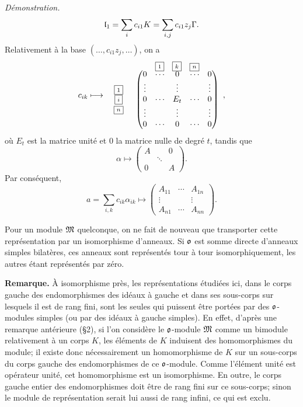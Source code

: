 \emph{Démonstration.}
\[
        \mathfrak{l}_1=\sum_i c_{i1}K=\sum_{i,j}c_{i1}z_j\Gamma.
\]
Relativement à la base $(\ldots,c_{i1}z_j,\ldots)$, on a
\[
c_{ik}\longmapsto
\begin{array}{c@{\quad}c}
 & \begin{array}{ccc} \boxed{\scriptstyle 1} & \boxed{\scriptstyle k} & \boxed{\scriptstyle n} \end{array}\\[-.2em]
\begin{array}{c}\boxed{\scriptstyle 1}\\ \boxed{\scriptstyle i}\\ \boxed{\scriptstyle n}\end{array}
&
\begin{pmatrix}
0&\cdots&0&\cdots&0\\
\vdots&&\vdots&&\vdots\\
0&\cdots&E_t&\cdots&0\\
\vdots&&\vdots&&\vdots\\
0&\cdots&0&\cdots&0
\end{pmatrix}
\end{array},
\]
où $E_t$ est la matrice unité et $0$ la matrice nulle de degré $t$, tandis que
\[
        \alpha\longmapsto
        \begin{pmatrix}
        A& &0\\
         &\ddots&\\
        0& &A
        \end{pmatrix}.
\]
Par conséquent,
\[
        a=\sum_{i,k}c_{ik}\alpha_{ik}\longmapsto
        \begin{pmatrix}
        A_{11}&\cdots&A_{1n}\\
        \vdots&&\vdots\\
        A_{n1}&\cdots&A_{nn}
        \end{pmatrix}.
\]

Pour un module $\mathfrak{M}$ quelconque, on ne fait de nouveau que transporter cette représentation par un isomorphisme d'anneaux. Si $\mathfrak{o}$ est somme directe d'anneaux simples bilatères, ces anneaux sont représentés tour à tour isomorphiquement, les autres étant représentés par zéro.

\textbf{Remarque.} À isomorphisme près, les représentations étudiées ici, dans le corps gauche des endomorphismes des idéaux à gauche et dans ses sous-corps sur lesquels il est de rang fini, sont les seules qui puissent être portées par des $\mathfrak{o}$-modules simples (ou par des idéaux à gauche simples). En effet, d'après une remarque antérieure (\S{}2), si l'on considère le $\mathfrak{o}$-module $\mathfrak{M}$ comme un bimodule relativement à un corps $K$, les éléments de $K$ induisent des homomorphismes du module; il existe donc nécessairement un homomorphisme de $K$ sur un sous-corps du corps gauche des endomorphismes de ce $\mathfrak{o}$-module. Comme l'élément unité est opérateur unité, cet homomorphisme est un isomorphisme. En outre, le corps gauche entier des endomorphismes doit être de rang fini sur ce sous-corps; sinon le module de représentation serait lui aussi de rang infini, ce qui est exclu.


